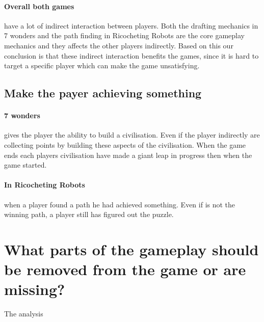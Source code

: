 \documentclass[a4paper]{article}
\begin{document}
\paragraph{Overall both games} have a lot of indirect interaction between players. Both the drafting mechanics in 7 wonders and the path finding in Ricocheting Robots are the core gameplay mechanics and they affects the other players indirectly. Based on this our conclusion is that these indirect interaction benefits the games, since it is hard to target a specific player which can make the game unsatisfying.

\subsection{Make the payer achieving something}
\paragraph{7 wonders} gives the player the ability to build a civilisation. Even if the player indirectly are collecting points by building these aspects of the civilisation. When the game ends each players civilisation have made a giant leap in progress then when the game started. 

\paragraph{In Ricocheting Robots} when a player found a path he had achieved something. Even if is not the winning path, a player still has figured out the puzzle.

\section{What parts of the gameplay should be removed from the game or are missing?}
The analysis 


\newpage


\end{document}

